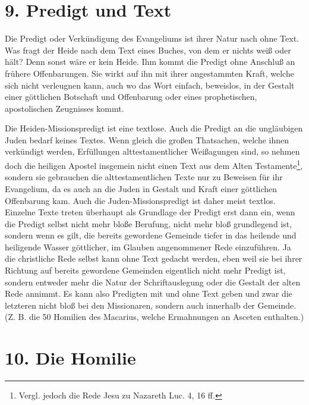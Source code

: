 \section{9. Predigt und Text}

Die Predigt oder Verkündigung des Evangeliums ist ihrer Natur nach ohne Text. Was fragt der Heide nach dem Text eines Buches, von dem er nichts weiß oder hält? Denn sonst wäre er kein Heide. Ihm kommt die Predigt ohne Anschluß an frühere Offenbarungen. Sie wirkt auf ihn mit ihrer
angestammten Kraft, welche sich nicht verleugnen kann, auch wo das Wort einfach, beweislos, in der Gestalt einer göttlichen Botschaft und Offenbarung oder eines prophetischen, apostolischen Zeugnisses kommt.

Die Heiden-Missionspredigt ist eine textlose. Auch die Predigt an die ungläubigen Juden bedarf keines Textes. Wenn gleich die großen Thatsachen, welche ihnen verkündigt werden, Erfüllungen alttestamentlicher Weißagungen sind, so nehmen doch die heiligen Apostel insgemein nicht einen Text aus dem Alten Testamente\footnote{Vergl. jedoch die Rede Jesu zu Nazareth Luc. 4, 16 ff.}, sondern sie gebrauchen die alttestamentlichen Texte nur zu Beweisen für ihr Evangelium, da es auch an die Juden in Gestalt und Kraft einer göttlichen Offenbarung kam. Auch die Juden-Missionspredigt ist daher meist textlos. Einzelne Texte treten überhaupt als Grundlage der Predigt erst dann ein, wenn die Predigt selbst nicht mehr bloße Berufung, nicht mehr bloß grundlegend ist, sondern wenn es gilt, die bereits gewordene Gemeinde tiefer in das heilende und heiligende Wasser göttlicher, im Glauben angenommener Rede einzuführen. Ja die christliche Rede selbst kann ohne Text gedacht werden, eben weil sie bei ihrer Richtung auf bereits gewordene Gemeinden eigentlich nicht mehr Predigt ist, sondern entweder mehr die Natur der Schriftauslegung oder die Gestalt der alten Rede annimmt. Es kann also Predigten mit und ohne Text geben und zwar die letzteren nicht bloß bei den Missionaren, sondern auch innerhalb
der Gemeinde. (Z. B. die 50 Homilien des Macarius, welche Ermahnungen an Asceten enthalten.)

\section{10. Die Homilie}

